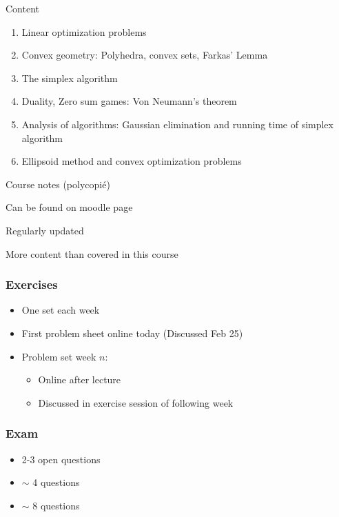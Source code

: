    \begin{frame}{Content}
   
     \begin{enumerate}
     \item    Linear optimization problems 
     \item    Convex geometry: Polyhedra, convex sets, Farkas' Lemma 
     \item    The simplex algorithm
     \item     Duality, Zero sum games: Von Neumann's theorem 
     \item     Analysis of algorithms: Gaussian elimination and running time of simplex algorithm
\item     Ellipsoid method and convex optimization problems
   \end{enumerate}

   \end{frame}

   \begin{frame}{Course notes (polycopié)}

     \bigskip 
     
     Can be found on moodle page

     \bigskip 
     Regularly updated 

     \bigskip 

     More content than covered in this course    
     
   \end{frame}
   


   \begin{frame}
     \frametitle{Exercises}

     \begin{itemize}
     \item One set each week 
     \item First problem sheet online today (Discussed Feb 25) 
     \item Problem set week $n$:
       \begin{itemize}
       \item Online after lecture
       \item Discussed in exercise session of following week 
       \end{itemize}
     \end{itemize}     
   \end{frame}

   \begin{frame}
     \frametitle{Exam}

     \begin{itemize}
     \item 2-3 open questions 
     \item $∼$ 4 questions   
     \item  $∼$ 8 questions      
     \end{itemize}

   \end{frame}


